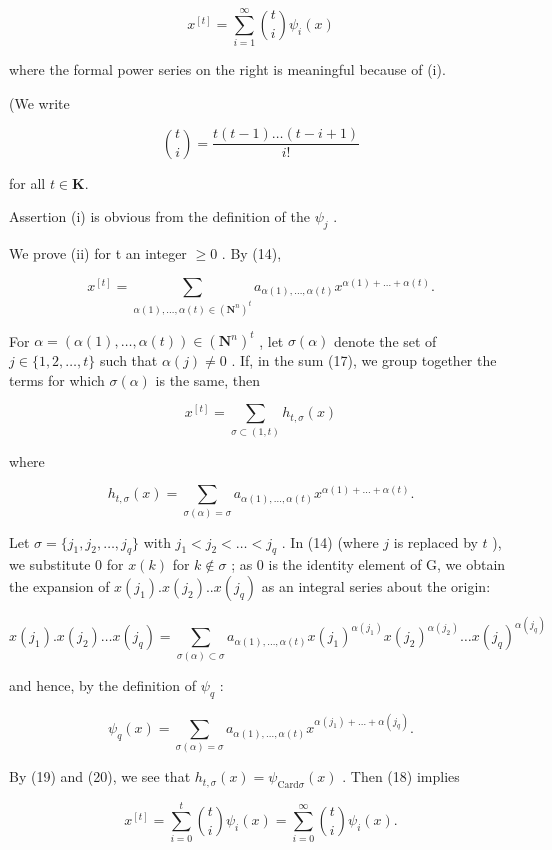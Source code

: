 \[
x ^ {[ t ]} = \sum_ {i = 1} ^ {\infty} \binom {t} {i} \psi_ {i} (x)\tag{16}
\]

where the formal power series on the right is meaningful because of (i).

(We write

\[
\binom {t} {i} = \frac {t (t - 1) \dots (t - i + 1)}{i !}
\]

for all \(t\in \mathbf{K}.\)

Assertion (i) is obvious from the definition of the \(\psi_{j}\) .

We prove (ii) for t an integer \(\geqslant0\) . By (14),

\[
x ^ {[ t ]} = \sum_ {\alpha (1),\ldots,\alpha (t)\in(\mathbf{N}^{n})^{t}} a _ {\alpha (1), \dots , \alpha (t)} x ^ {\alpha (1) + \dots + \alpha (t)}.\tag{17}
\]

For \(\alpha = (\alpha(1),\ldots,\alpha(t))\in(\mathbf{N}^{n})^{t}\) , let \(\sigma(\alpha)\) denote the set of \(j\in\{1,2,\ldots,t\}\) such that \(\alpha(j)\neq0\) . If, in the sum (17), we group together the terms for which \(\sigma(\alpha)\) is the same, then

\[
x ^ {[ t ]} = \sum_ {\sigma \subset (1, t)} h _ {t, \sigma} (x)\tag{18}
\]

where

\[
h _ {t, \sigma} (x) = \sum_ {\sigma (\alpha) = \sigma} a _ {\alpha (1), \dots , \alpha (t)} x ^ {\alpha (1) + \dots + \alpha (t)}.\tag{19}
\]

Let \(\sigma = \{j_1, j_2, \ldots, j_q\}\) with \(j_1 < j_2 < \ldots < j_q\) . In (14) (where \(j\) is replaced by \(t\) ), we substitute 0 for \(x(k)\) for \(k \notin \sigma\) ; as 0 is the identity element of G, we obtain the expansion of \(x(j_1).x(j_2)..x(j_q)\) as an integral series about the origin:

\[
x (j _ {1}). x (j _ {2}) \dots x (j _ {q}) = \sum_ {\sigma (\alpha) \subset \sigma} a _ {\alpha (1), \dots , \alpha (t)} x (j _ {1}) ^ {\alpha (j _ {1})} x (j _ {2}) ^ {\alpha (j _ {2})} \dots x (j _ {q}) ^ {\alpha (j _ {q})}
\]

and hence, by the definition of \(\psi_q\) :

\[
\psi_ {q} (x) = \sum_ {\sigma (\alpha) = \sigma} a _ {\alpha (1), \dots , \alpha (t)} x ^ {\alpha (j _ {1}) + \dots + \alpha (j _ {q})}.\tag{20}
\]

By (19) and (20), we see that \(h_{t,\sigma}(x) = \psi_{\mathrm{Card}\sigma}(x)\) . Then (18) implies

\[
x ^ {[ t ]} = \sum_ {i = 0} ^ {t} \binom {t} {i} \psi_ {i} (x) = \sum_ {i = 0} ^ {\infty} \binom {t} {i} \psi_ {i} (x).
\]

